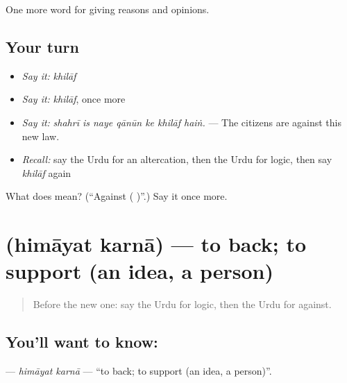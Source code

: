 \begin{grammarlens}[title={What you've built}]
One more word for giving reasons and opinions.
\end{grammarlens}

\subsection*{Your turn}
\begin{itemize}
\raggedright
  \item \emph{Say it:} \emph{khilāf}
  \item \emph{Say it:} \emph{khilāf}, once more
  \item \emph{Say it:} \emph{shahrī is naye qānūn ke khilāf haiṅ.} — The citizens are against this new law.
  \item \emph{Recall:} say the Urdu for an altercation, then the Urdu for logic, then say \emph{khilāf} again
\end{itemize}

\begin{tcolorbox}[breakable,colback=teal!4,colframe=teal!35!black,title={Before you move on}]
What does  mean? (\textquotedblleft{}Against ( )\textquotedblright{}.) Say it once more.
\end{tcolorbox}
\section[\texorpdfstring{\ur{حمایت} \ur{کرنا} (himāyat karnā)}{حمایت کرنا (himāyat karnā)}]{  (himāyat karnā) — to back; to support (an idea, a person)}

\label{lesson:UR-C335-himayat-karna}



\begin{quote}
Before the new one: say the Urdu for logic, then the Urdu for against.
\end{quote}

\subsection*{You'll want to know:  }
\textbf{ } — \emph{himāyat karnā} — \textquotedblleft{}to back; to support (an idea, a person)\textquotedblright{}.

\begin{quote}
       
\end{quote}

